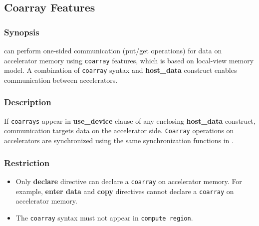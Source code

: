 \subsection{Coarray Features} \label{sec:coarray}
\subsubsection*{Synopsis}
{\XACC} can perform one-sided communication (put/get operations) for data on accelerator memory using {\tt coarray} features,
which is based on {\XMP} local-view memory model.
A combination of {\tt coarray} syntax and {\OACC} {\bf host\_data} construct enables communication between accelerators.

\subsubsection*{Description}
If {\tt coarrays} appear in {\OACC} {\bf use\_device} clause of any {\OACC} enclosing {\bf host\_data} construct, 
communication targets data on the accelerator side. 
{\tt Coarray} operations on accelerators are synchronized using the same synchronization functions in {\XMP}.

\subsubsection*{Restriction}
\begin{itemize}
 \item Only {\OACC} {\bf declare} directive can declare a {\tt coarray} on accelerator memory.
   For example,
   {\OACC} {\bf enter data} and {\bf copy} directives cannot declare a {\tt coarray} on accelerator memory.
 \item The {\tt coarray} syntax must not appear in {\OACC} {\tt compute region}.
\end{itemize}

